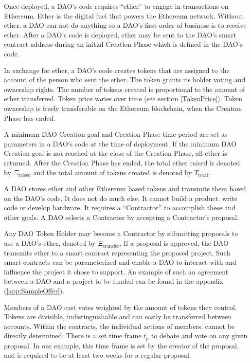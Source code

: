 \documentclass[9pt,oneside]{amsart}
\begin{document}
\begin{multicols}{2}
Once deployed, a DAO's code requires ``ether'' to engage in transactions on Ethereum. Ether is the digital fuel that powers the Ethereum network. Without ether, a DAO can not do anything so a DAO's first order of business is to receive ether. After a DAO's code is deployed, ether may be sent to the DAO's smart contract address during an initial Creation Phase which is defined in the DAO's code. 

In exchange for ether, a DAO's code creates tokens that are assigned to the account of the person who sent the ether. The token grants its holder voting and ownership rights. The number of tokens created is proportional to the amount of ether transferred. Token price varies over time (see section \ref{TokenPrice}). Token ownership is freely transferable on the Ethereum blockchain, when the Creation Phase has ended.

A minimum DAO Creation goal and Creation Phase time-period are set as parameters in a DAO's code at the time of deployment. If the minimum DAO Creation goal is not reached at the close of the Creation Phase, all ether is returned. After the Creation Phase has ended, the total ether raised is denoted by $\Xi_{\text{raised}}$ and the total amount of tokens created is denoted by $T_{\text{total}}$. 

A DAO stores ether and other Ethereum based tokens and transmits them based on the DAO's code. It does not do much else. It cannot build a product, write code or develop hardware. It requires a ``Contractor'' to accomplish these and other goals. A DAO selects a Contractor by accepting a Contractor's proposal. 

Any DAO Token Holder may become a Contractor by submitting proposals to use a DAO's ether, denoted by $\Xi_{\text{transfer}}$. If a proposal is approved, the DAO transmits ether to a smart contract representing the proposed project. Such smart contracts can be parameterized and enable a DAO to interact with and influence the project it chose to support.
An example of such an agreement between a DAO and a project to be funded can be found in the appendix (\ref{app:SampleOffer}).

Members of a DAO cast votes weighted by the amount of tokens they control. Tokens are divisible, indistinguishable and can easily be transferred between accounts. Within the contracts, the individual actions of members, cannot be directly determined. There is a set time frame $t_p$ to debate and vote on any given proposal. In our example, this time frame is set by the creator of the proposal, and is required to be at least two weeks for a regular proposal.


\end{multicols}
\end{document}
